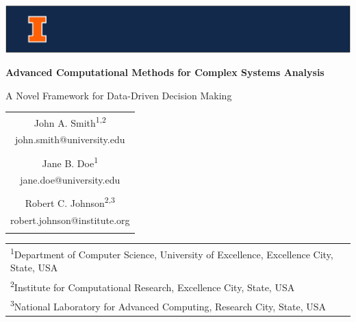 \documentclass[12pt, letterpaper, onecolumn, final]{article}
\makeatletter
\newcommand{\manuscripttitle}{Advanced Computational Methods for Complex Systems Analysis}
\newcommand{\manuscriptsubtitle}{A Novel Framework for Data-Driven Decision Making}
\newcommand{\authorone}{John A. Smith}
\newcommand{\authoroneaffil}{1,2}
\newcommand{\authoroneemail}{john.smith@university.edu}
\newcommand{\authoroneorcid}{0000-0000-0000-0000}
\newcommand{\authortwo}{Jane B. Doe}
\newcommand{\authortwoaffil}{1}
\newcommand{\authortwoemail}{jane.doe@university.edu}
\newcommand{\authortwoorcid}{0000-0000-0000-0001}
\newcommand{\authorthree}{Robert C. Johnson}
\newcommand{\authorthreeaffil}{2,3}
\newcommand{\authorthreeemail}{robert.johnson@institute.org}
\newcommand{\authorthreeorcid}{0000-0000-0000-0002}
\newcommand{\affilone}{Department of Computer Science, University of Excellence, Excellence City, State, USA}
\newcommand{\affiltwo}{Institute for Computational Research, Excellence City, State, USA}
\newcommand{\affilthree}{National Laboratory for Advanced Computing, Research City, State, USA}
\theoremstyle{plain}
\theoremstyle{definition}
\theoremstyle{remark}
\makeatother
\begin{document}

\begin{titlepage}
    \centering
    
    \includegraphics[width=\textwidth]{Cover_header.png}\\
    \vspace*{0.5cm}
    {\LARGE\bfseries \manuscripttitle \par}
    \vspace{0.5cm}
    {\large \manuscriptsubtitle \par}
    \vspace{1.0cm}
    
    {\large
    \begin{tabular}{c}
        \authorone\textsuperscript{\authoroneaffil} \\
        \small\authoroneemail \\
        \small\orcidlinkc{\authoroneorcid} \\[0.5cm]
        
        \authortwo\textsuperscript{\authortwoaffil} \\
        \small\authortwoemail \\
        \small\orcidlinkc{\authortwoorcid} \\[0.5cm]
        
        \authorthree\textsuperscript{\authorthreeaffil} \\
        \small\authorthreeemail \\
        \small\orcidlinkc{\authorthreeorcid} \\
    \end{tabular}
    \par}
    
    \vspace{1cm}
    
    {\small
    \begin{tabular}{@{}p{}@{}}
        \textsuperscript{1}\affilone \\[0.3cm]
        \textsuperscript{2}\affiltwo \\[0.3cm]
        \textsuperscript{3}\affilthree \\
    \end{tabular}
    \par}
    

\end{titlepage}
\end{document}
